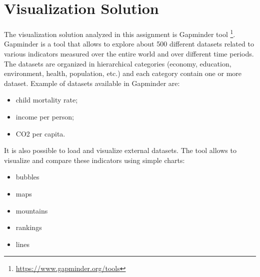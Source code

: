 \section{Visualization Solution}
\label{sec:visualization_solution}

The visualization solution analyzed in this assignment is Gapminder tool \footnote{\url{https://www.gapminder.org/tools}}.
Gapminder is a tool that allows to explore about \num{500} different datasets related to various indicators measured over the entire world and over different time periods.
The datasets are organized in hierarchical categories (economy, education, environment, health, population, etc.) and each category contain one or more dataset.
Example of datasets available in Gapminder are:
\begin{itemize}
    \item child mortality rate;
    \item income per person;
    \item CO2 per capita.
\end{itemize}
It is also possible to load and visualize external datasets.
The tool allows to visualize and compare these indicators using simple charts:
\begin{itemize}
    \item bubbles
    \item maps
    \item mountains
    \item rankings
    \item lines
\end{itemize}

